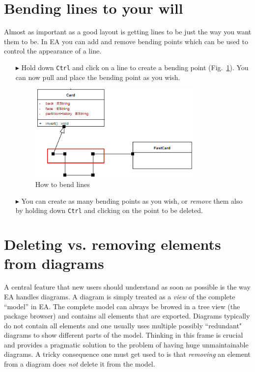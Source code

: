\section{Bending lines to your will}

Almost as important as a good layout is getting lines to be just the way you want them to be.
In EA you can add and remove bending points which can be used to control the appearance of a line.

\begin{enumerate}
\item[$\blacktriangleright$]Hold down \texttt{Ctrl} and click on a line to create a bending point (Fig.~\ref{fig_bendLine01}).
You can now pull and place the bending point as you wish.
 
\begin{figure}[htbp]
\begin{center}
  \includegraphics[width=0.8\textwidth]{pics/tricks/bendLine/bendLine1}
  \caption{How to bend lines}   
  \label{fig_bendLine01}
\end{center}
\end{figure}

\item[$\blacktriangleright$] You can create as many bending points as you wish, or \emph{remove} them also by holding down \texttt{Ctrl} and clicking on the point to be deleted.
\end{enumerate}

\section{Deleting vs. removing elements from diagrams} 

A central feature that new users should understand as soon as possible is the way EA handles diagrams.
A diagram is simply treated as a \emph{view} of the complete ``model'' in EA.
The complete model can always be browed in a tree view (the package browser) and contains all elements that are exported.
Diagrams typically do not contain all elements and one usually uses multiple possibly ``redundant" diagrams to show different parts of the model.
Thinking in this frame is crucial and provides a pragmatic solution to the problem of having huge unmaintainable diagrams.
A tricky consequence one must get used to is that \emph{removing} an element from a diagram does \emph{not} delete it from the model.

